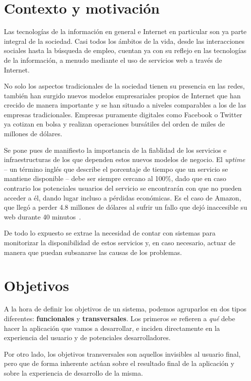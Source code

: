 \section{Contexto y motivación}
Las tecnologías de la información en general e Internet en particular son ya
parte integral de la sociedad. Casi todos los ámbitos de la vida,
desde las interacciones sociales hasta la búsqueda de empleo, cuentan ya con
su reflejo en las tecnologías de la información, a menudo mediante el uso de
servicios web a través de Internet.

No solo los aspectos tradicionales de la sociedad tienen su presencia en las
redes, también han surgido nuevos modelos empresariales propios de Internet que
han crecido de manera importante y se han situado a niveles comparables a los de
las empresas tradicionales. Empresas puramente digitales como Facebook o Twitter
ya cotizan en bolsa y realizan operaciones bursátiles del orden de miles de
millones de dólares.

Se pone pues de manifiesto la importancia de la fiablidad de los servicios e
infraestructuras de los que dependen estos nuevos modelos de negocio. El
\textit{uptime} -- un término inglés que describe el porcentaje de tiempo que un
servicio se mantiene disponible -- debe ser siempre cercano al 100\%, dado que
en caso contrario los potenciales usuarios del servicio se encontrarán con que
no pueden acceder a él, dando lugar incluso a pérdidas económicas. Es el caso de
Amazon, que llegó a perder 4.8 millones de dólares al sufrir un fallo que dejó
inaccesible su web durante 40 minutos~\cite{amazon}.

De todo lo expuesto se extrae la necesidad de contar con sistemas para
monitorizar la disponibilidad de estos servicios y, en caso necesario, actuar de
manera que puedan subsanarse las causas de los problemas.

\section{Objetivos}
\label{sec:objetivos}

A la hora de definir los objetivos de un sistema, podemos agruparlos
en dos tipos diferentes: \textbf{funcionales} y
\textbf{transversales}. Los primeros se refieren a \textit{qué} debe
hacer la aplicación que vamos a desarrollar, e inciden
directamente en la experiencia del usuario y de potenciales
desarrolladores.

Por otro lado, los objetivos transversales son aquellos invisibles al
usuario final, pero que de forma inherente actúan sobre el resultado
final de la aplicación y sobre la experiencia de desarrollo de la misma.

